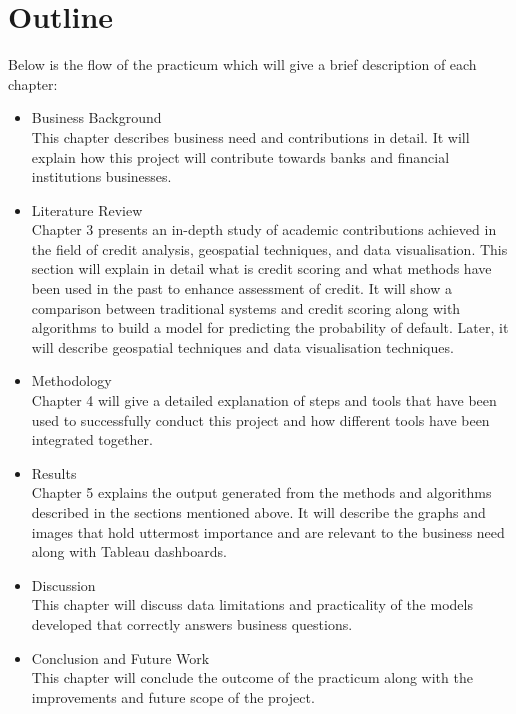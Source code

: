 \section{Outline}
Below is the flow of the practicum which will give a brief description of each chapter:
\begin{itemize}
\item Business Background \\ This chapter describes business need and contributions in detail. It will explain how this project will contribute towards banks and financial institutions businesses. 
\item Literature Review \\ Chapter 3 presents an in-depth study of academic contributions achieved in the field of credit analysis, geospatial techniques, and data visualisation. This section will explain in detail what is credit scoring and what methods have been used in the past to enhance assessment of credit. It will show a comparison between traditional systems and credit scoring along with algorithms to build a model for predicting the probability of default. Later, it will describe geospatial techniques and data visualisation techniques.
\item Methodology \\ Chapter 4 will give a detailed explanation of steps and tools that have been used to successfully conduct this project and how different tools have been integrated together.
\item Results \\ Chapter 5 explains the output generated from the methods and algorithms described in the sections mentioned above. It will describe the graphs and images that hold uttermost importance and are relevant to the business need along with Tableau dashboards.
\item Discussion \\ This chapter will discuss data limitations and practicality of the models developed that correctly answers business questions. 
\item Conclusion and Future Work \\ This chapter will conclude the outcome of the practicum along with the improvements and future scope of the project.
\end{itemize}
